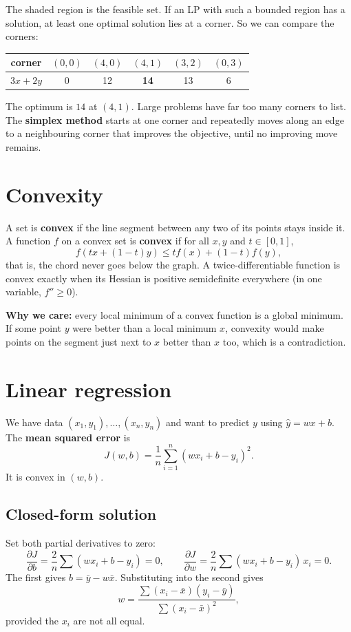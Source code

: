 \documentclass[11pt,a4paper]{article}
\begin{document}
The shaded region is the feasible set. If an LP with such a bounded region has a solution, at least one optimal solution lies at a corner. So we can compare the corners:

\begin{center}
\begin{tabular}{c|ccccc}
corner & $(0,0)$ & $(4,0)$ & $(4,1)$ & $(3,2)$ & $(0,3)$\\ \hline
$3x+2y$ & 0 & 12 & \textbf{14} & 13 & 6
\end{tabular}
\end{center}

The optimum is $14$ at $(4,1)$. Large problems have far too many corners to list. The \textbf{simplex method} starts at one corner and repeatedly moves along an edge to a neighbouring corner that improves the objective, until no improving move remains.

\section{Convexity}
A set is \textbf{convex} if the line segment between any two of its points stays inside it. A function $f$ on a convex set is \textbf{convex} if for all $x, y$ and $t \in [0,1]$,
\[ f(tx + (1-t)y) \le t f(x) + (1-t) f(y), \]
that is, the chord never goes below the graph. A twice-differentiable function is convex exactly when its Hessian is positive semidefinite everywhere (in one variable, $f'' \ge 0$).

\textbf{Why we care:} every local minimum of a convex function is a global minimum. If some point $y$ were better than a local minimum $x$, convexity would make points on the segment just next to $x$ better than $x$ too, which is a contradiction.

\section{Linear regression}
We have data $(x_1, y_1), \dots, (x_n, y_n)$ and want to predict $y$ using $\hat{y} = wx + b$. The \textbf{mean squared error} is
\[ J(w,b) = \frac{1}{n}\sum_{i=1}^{n} (w x_i + b - y_i)^2 . \]
It is convex in $(w,b)$.

\subsection{Closed-form solution}
Set both partial derivatives to zero:
\[ \frac{\partial J}{\partial b} = \frac{2}{n}\sum (w x_i + b - y_i) = 0, \qquad
   \frac{\partial J}{\partial w} = \frac{2}{n}\sum (w x_i + b - y_i)\,x_i = 0. \]
The first gives $b = \bar{y} - w\bar{x}$. Substituting into the second gives
\[ w = \frac{\sum (x_i - \bar{x})(y_i - \bar{y})}{\sum (x_i - \bar{x})^2}, \]
provided the $x_i$ are not all equal.
\end{document}

